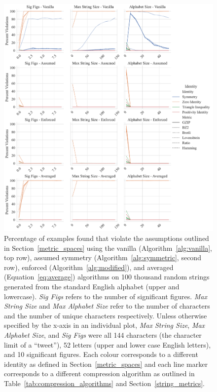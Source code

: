 \documentclass[conference]{IEEEtran}
\begin{document}
\begin{figure}[htb]
    \centering
    \includegraphics[width=\textwidth]{images/synthetic_check.pdf}
    \caption{
    Percentage of examples found that violate the assumptions outlined in Section~\ref{metric_spaces} using the vanilla (Algorithm~\ref{alg:vanilla}, top row), assumed symmetry (Algorithm~\ref{alg:symmetric}, second row), enforced (Algorithm~\ref{alg:modified}), and averaged (Equation~\ref{eq:average}) algorithms on 100 thousand random strings generated from the standard English alphabet (upper and lowercase). 
    \textit{Sig Figs} refers to the number of significant figures. \textit{Max String Size} and \textit{Max Alphabet Size} refer to the number of characters and the number of unique characters respectively. 
    Unless otherwise specified by the x-axis in an individual plot, \textit{Max String Size}, \textit{Max Alphabet Size}, and \textit{Sig Figs} were all 144 characters (the character limit of a ``tweet''), 52 letters (upper and lower case English letters), and 10 significant figures. Each colour corresponds to a different identity as defined in Section~\ref{metric_spaces} and each line marker corresponds to a different compression algorithm as outlined in Table~\ref{tab:compression_algorithms} and Section~\ref{string_metrics}.
    }
    \label{fig:synthetic_check}
\end{figure}
\end{document}

